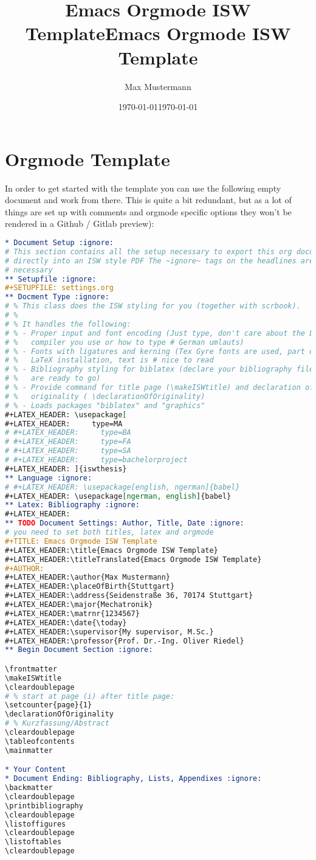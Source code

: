 \documentclass[a4paper,oneside,toc=bibliography,toc=listof]{scrbook}
\title{Emacs Orgmode ISW Template}
\author{Max Mustermann}
\date{\today}
\date{\today}
\title{Emacs Orgmode ISW Template}
\begin{document}
\frontmatter
\makeISWtitle
\cleardoublepage

\setcounter{page}{1} 
\declarationOfOriginality

\cleardoublepage
\tableofcontents
\mainmatter
\chapter{Orgmode Template}
\label{sec:org99c1bb0}
In order to get started with the template you can use the following empty
document and work from there. This is quite a bit redundant, but as a lot of
things are set up with comments and orgmode specific options they won't be
rendered in a Github / Gitlab preview):

\begin{lstlisting}[language=org,numbers=none]
* Document Setup :ignore:
# This section contains all the setup necessary to export this org document
# directly into an ISW style PDF The ~ignore~ tags on the headlines are
# necessary
** Setupfile :ignore:
#+SETUPFILE: settings.org
** Docment Type :ignore:
# % This class does the ISW styling for you (together with scrbook).
# %
# % It handles the following:
# % - Proper input and font encoding (Just type, don't care about the LaTeX
# %   compiler you use or how to type # German umlauts)
# % - Fonts with ligatures and kerning (Tex Gyre fonts are used, part of every
# %   LaTeX installation, text is # nice to read
# % - Bibliography styling for biblatex (declare your bibliography file and you
# %   are ready to go)
# % - Provide command for title page (\makeISWtitle) and declaration of
# %   originality ( \declarationOfOriginality)
# % - Loads packages "biblatex" and "graphics"
#+LATEX_HEADER: \usepackage[
#+LATEX_HEADER:     type=MA
# #+LATEX_HEADER:     type=BA
# #+LATEX_HEADER:     type=FA
# #+LATEX_HEADER:     type=SA
# #+LATEX_HEADER:     type=bachelorproject
#+LATEX_HEADER: ]{iswthesis}
** Language :ignore:
# #+LATEX_HEADER: \usepackage[english, ngerman]{babel}
#+LATEX_HEADER: \usepackage[ngerman, english]{babel}
** Latex: Bibliography :ignore:
#+LATEX_HEADER: 
** TODO Document Settings: Author, Title, Date :ignore:
# you need to set both titles, latex and orgmode
#+TITLE: Emacs Orgmode ISW Template
#+LATEX_HEADER:\title{Emacs Orgmode ISW Template}
#+LATEX_HEADER:\titleTranslated{Emacs Orgmode ISW Template}
#+AUTHOR: 
#+LATEX_HEADER:\author{Max Mustermann}
#+LATEX_HEADER:\placeOfBirth{Stuttgart}
#+LATEX_HEADER:\address{Seidenstraße 36, 70174 Stuttgart}
#+LATEX_HEADER:\major{Mechatronik}
#+LATEX_HEADER:\matrnr{1234567}
#+LATEX_HEADER:\date{\today}
#+LATEX_HEADER:\supervisor{My supervisor, M.Sc.}
#+LATEX_HEADER:\professor{Prof. Dr.-Ing. Oliver Riedel}
** Begin Document Section :ignore:

\frontmatter
\makeISWtitle
\cleardoublepage
# % start at page (i) after title page:
\setcounter{page}{1} 
\declarationOfOriginality
# % Kurzfassung/Abstract
\cleardoublepage
\tableofcontents
\mainmatter

* Your Content
* Document Ending: Bibliography, Lists, Appendixes :ignore:
\backmatter
\cleardoublepage
\printbibliography
\cleardoublepage
\listoffigures
\cleardoublepage
\listoftables
\cleardoublepage
\end{lstlisting}
\end{document}
